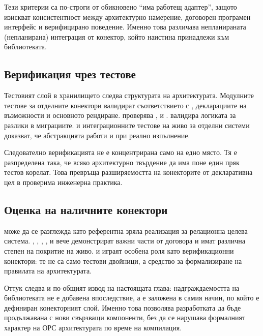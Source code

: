 Тези критерии са по-строги от обикновено ``има работещ адаптер'', защото изискват консистентност между архитектурно намерение, договорен програмен интерфейс и верифицирано поведение. Именно това различава непланираната (непланирана) интеграция от конектор, който наистина принадлежи към библиотеката.

\subsection{Верификация чрез тестове}

Тестовият слой в хранилището следва структурата на архитектурата. Модулните тестове за отделните конектори валидират съответствието с , декларациите на възможности и основното рендиране.  проверява ,  и .  валидира логиката за разлики в миграциите.  и интеграционните тестове на живо за отделни системи доказват, че абстракцията работи и при реално изпълнение.

Следователно верификацията не е концентрирана само на едно място. Тя е разпределена така, че всяко архитектурно твърдение да има поне един пряк тестов корелат. Това превръща разширяемостта на конекторите от декларативна цел в проверима инженерна практика.

\subsection{Оценка на наличните конектори}

 може да се разглежда като референтна зряла реализация за релационна целева система. , , , ,  и  вече демонстрират важни части от договора и имат различна степен на покритие на живо.  и  играят особена роля като верификационни конектори: те не са само тестови двойници, а средство за формализиране на правилата на архитектурата.

Оттук следва и по-общият извод на настоящата глава: надграждаемостта на библиотеката не е добавена впоследствие, а е заложена в самия начин, по който е дефиниран конекторният слой. Именно това позволява разработката да бъде продължавана с нови свързващи компоненти, без да се нарушава формалният характер на ОРС архитектурата по време на компилация.
